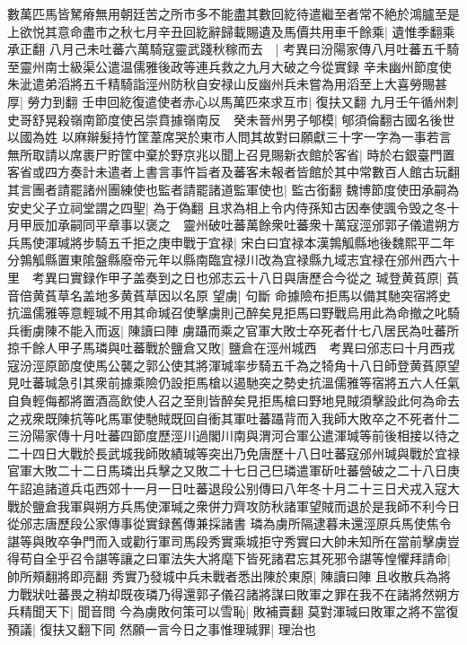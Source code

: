 數萬匹馬皆駑瘠無用朝廷苦之所市多不能盡其數回紇待遣繼至者常不絶於鴻臚至是上欲悦其意命盡市之秋七月辛丑回紇辭歸載賜遺及馬價共用車千餘乘|{
	遺惟季翻乘承正翻}
八月己未吐蕃六萬騎寇靈武踐秋稼而去　|{
	考異曰汾陽家傳八月吐蕃五千騎至靈州南士級渠公遣温儒雅後政等連兵救之九月大破之今從實録}
辛未幽州節度使朱泚遣弟滔將五千精騎詣涇州防秋自安禄山反幽州兵未嘗為用滔至上大喜勞賜甚厚|{
	勞力到翻}
壬申回紇復遣使者赤心以馬萬匹來求互市|{
	復扶又翻}
九月壬午循州刺史哥舒晃殺嶺南節度使呂崇賁據嶺南反　癸未晉州男子郇模|{
	郇須倫翻古國名後世以國為姓}
以麻辮髮持竹筐葦席哭於東市人問其故對曰願獻三十字一字為一事若言無所取請以席裹尸貯筐中棄於野京兆以聞上召見賜新衣館於客省|{
	時於右銀臺門置客省或四方奏計未遣者上書言事忤旨者及蕃客未報者皆館於其中常數百人館古玩翻}
其言團者請罷諸州團練使也監者請罷諸道監軍使也|{
	監古銜翻}
魏博節度使田承嗣為安史父子立祠堂謂之四聖|{
	為于偽翻}
且求為相上令内侍孫知古因奉使諷令毁之冬十月甲辰加承嗣同平章事以褒之　靈州破吐蕃萬餘衆吐蕃衆十萬寇涇邠郭子儀遣朔方兵馬使渾瑊將步騎五千拒之庚申戰于宜禄|{
	宋白曰宜禄本漢鶉觚縣地後魏熙平二年分鶉觚縣置東隂盤縣廢帝元年以縣南臨宜禄川改為宜禄縣九域志宜禄在邠州西六十里　考異曰實録作甲子盖奏到之日也邠志云十八日與唐歷合今從之}
瑊登黄萯原|{
	萯音倍黄萯草名盖地多黄萯草因以名原}
望虜|{
	句斷}
命據險布拒馬以備其馳突宿將史抗溫儒雅等意輕瑊不用其命瑊召使擊虜則己醉矣見拒馬曰野戰烏用此為命撤之叱騎兵衝虜陳不能入而返|{
	陳讀曰陣}
虜躡而乘之官軍大敗士卒死者什七八居民為吐蕃所掠千餘人甲子馬璘與吐蕃戰於鹽倉又敗|{
	鹽倉在涇州城西　考異曰邠志曰十月西戎寇汾涇原節度使馬公襲之郭公使其將渾瑊率步騎五千為之犄角十八日師登黄萯原望見吐蕃瑊急引其衆前據乘險仍設拒馬槍以遏馳突之勢史抗溫儒雅等宿將五六人任氣自負輕侮都將置酒高飲使人召之至則皆醉矣見拒馬槍曰野地見賊須擊設此何為命去之戎衆既陳抗等叱馬軍使馳賊既回自衝其軍吐蕃躡背而入我師大敗卒之不死者什二三汾陽家傳十月吐蕃四節度歷涇川過閣川南與渭河合軍公遣渾瑊等前後相接以待之二十四日大戰於長武城我師敗績瑊等突出乃免唐歷十八日吐蕃寇邠州瑊與戰於宜禄官軍大敗二十二日馬璘出兵擊之又敗二十七日己巳璘遣軍斫吐蕃營破之二十八日庚午詔追諸道兵屯西郊十一月一日吐蕃退段公别傳曰八年冬十月二十三日犬戎入寇大戰於鹽倉我軍與朔方兵馬使渾瑊之衆併力齊攻防秋諸軍望賊而退於是我師不利今日從邠志唐歷段公家傳事從實録舊傳兼採諸書}
璘為虜所隔逮暮未還涇原兵馬使焦令諶等與敗卒争門而入或勸行軍司馬段秀實乘城拒守秀實曰大帥未知所在當前擊虜豈得苟自全乎召令諶等讓之曰軍法失大將麾下皆死諸君忘其死邪令諶等惶懼拜請命|{
	帥所頰翻將即亮翻}
秀實乃發城中兵未戰者悉出陳於東原|{
	陳讀曰陣}
且收散兵為將力戰狀吐蕃畏之稍却既夜璘乃得還郭子儀召諸將謀曰敗軍之罪在我不在諸將然朔方兵精聞天下|{
	聞音問}
今為虜敗何策可以雪恥|{
	敗補賣翻}
莫對渾瑊曰敗軍之將不當復預議|{
	復扶又翻下同}
然願一言今日之事惟理瑊罪|{
	理治也}
